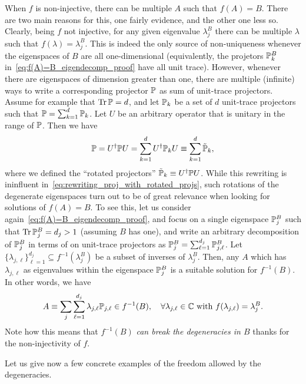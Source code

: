 When $f$ is non-injective, there can be multiple $A$ such that $f(A)=B$. There are two main reasons for this, one fairly evidence, and the other one less so.
Clearly, being $f$ not injective, for any given eigenvalue $\lambda_j^B$ there can be multiple $\lambda$ such that $f(\lambda)=\lambda_j^B$. This is indeed the only source of non-uniqueness whenever the eigenspaces of $B$ are all one-dimensional (equivalently, the projetors $\mathbb{P}_k^B$ in~\cref{eq:f(A)=B_eigendecomp_proof} have all unit trace).
However, whenever there are eigenspaces of dimension greater than one, there are multiple (infinite) ways to write a corresponding projector $\mathbb{P}$ as sum of unit-trace projectors. Assume for example that $\Tr\mathbb{P}=d$, and let $\mathbb{P}_k$ be a set of $d$ unit-trace projectors such that $\mathbb{P}=\sum_{k=1}^d \mathbb{P}_k$. Let $U$ be an arbitrary operator that is unitary in the range of $\mathbb{P}$.
Then we have
\begin{equation}
    \mathbb{P}=U^\dagger \mathbb{P} U =\sum_{k=1}^d U^\dagger \mathbb{P}_k U
    \equiv \sum_{k=1}^d \tilde{\mathbb{P}}_k,
    \label{eq:rewriting_proj_with_rotated_projs}
\end{equation}
where we defined the ``rotated projectors'' $\tilde{\mathbb{P}}_k\equiv U^\dagger \mathbb{P} U$.
While this rewriting is ininfluent in~\cref{eq:rewriting_proj_with_rotated_projs}, such rotations of the degenerate eigenspaces turn out to be of great relevance when looking for solutions of $f(A)=B$.
To see this, let us consider again~\cref{eq:f(A)=B_eigendecomp_proof}, and focus on a single eigenspace $\mathbb{P}_j^B$ such that $\Tr\mathbb{P}_j^B=d_j>1$ (assuming $B$ has one), and write an arbitrary decomposition of $\mathbb{P}_j^B$ in terms of on unit-trace projectors as $\mathbb{P}_j^B=\sum_{\ell=1}^{d_j}\mathbb{P}^B_{j,\ell}$.
Let $\{\lambda_{j,\ell}\}_{\ell=1}^{d_j}\subseteq f^{-1}(\lambda_j^B)$ be a subset of inverses of $\lambda_j^B$. Then, any $A$ which has $\lambda_{j,\ell}$ as eigenvalues within the eigenspace $\mathbb{P}_j^B$ is a suitable solution for $f^{-1}(B)$.
In other words, we have
\begin{equation}
    A \equiv \sum_j \sum_{\ell=1}^{d_j} \lambda_{j,\ell} \mathbb{P}_{j,\ell}\in f^{-1}(B),
    \quad \forall \lambda_{j,\ell}\in\mathbb{C} \text{ with } f(\lambda_{j,\ell})=\lambda_j^B.
    \label{eq:general_form_f-1B}
\end{equation}
Note how this means that $f^{-1}(B)$ \textit{can break the degeneracies in $B$} thanks for the non-injectivity of $f$.

Let us give now a few concrete examples of the freedom allowed by the degeneracies.


